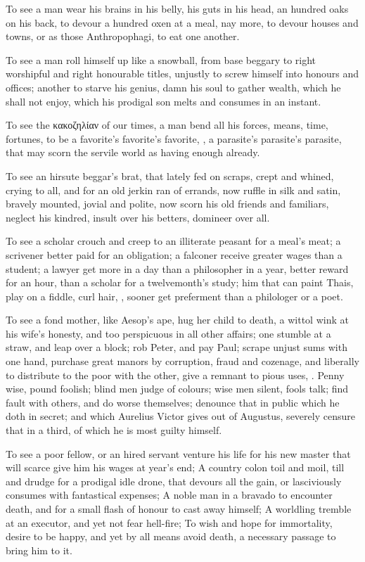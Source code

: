{To see a man wear his brains in his belly, his guts in his head,
an hundred oaks on his back, to devour a hundred oxen at a meal, nay
more, to devour houses and towns, or as those Anthropophagi, to
eat one another.

To see a man roll himself up like a snowball, from base beggary to
right worshipful and right honourable titles, unjustly to screw himself
into honours and offices; another to starve his genius, damn his soul
to gather wealth, which he shall not enjoy, which his prodigal son
melts and consumes in an instant. 

To see the κακοζηλίαν of our times, a man bend all his forces, means,
time, fortunes, to be a favorite's favorite's favorite, \etc{}, a
parasite's parasite's parasite, that may scorn the servile world as
having enough already.

To see an hirsute beggar's brat, that lately fed on scraps, crept and
whined, crying to all, and for an old jerkin ran of errands, now ruffle
in silk and satin, bravely mounted, jovial and polite, now scorn his
old friends and familiars, neglect his kindred, insult over his
betters, domineer over all.

To see a scholar crouch and creep to an illiterate peasant for a meal's
meat; a scrivener better paid for an obligation; a falconer receive
greater wages than a student; a lawyer get more in a day than a
philosopher in a year, better reward for an hour, than a scholar for a
twelvemonth's study; him that can paint Thais, play on a fiddle,
curl hair, \etc{}, sooner get preferment than a philologer or a poet.

To see a fond mother, like Aesop's ape, hug her child to death, a 
wittol wink at his wife's honesty, and too perspicuous in all other
affairs; one stumble at a straw, and leap over a block; rob Peter, and
pay Paul; scrape unjust sums with one hand, purchase great manors by
corruption, fraud and cozenage, and liberally to distribute to the poor
with the other, give a remnant to pious uses, \etc{}. Penny wise, pound
foolish; blind men judge of colours; wise men silent, fools talk; 
find fault with others, and do worse themselves; denounce that in
public which he doth in secret; and which Aurelius Victor gives out of
Augustus, severely censure that in a third, of which he is most guilty
himself.

To see a poor fellow, or an hired servant venture his life for his new
master that will scarce give him his wages at year's end; A country
colon toil and moil, till and drudge for a prodigal idle drone, that
devours all the gain, or lasciviously consumes with fantastical
expenses; A noble man in a bravado to encounter death, and for a small
flash of honour to cast away himself; A worldling tremble at an
executor, and yet not fear hell-fire; To wish and hope for immortality,
desire to be happy, and yet by all means avoid death, a necessary
passage to bring him to it.

}
